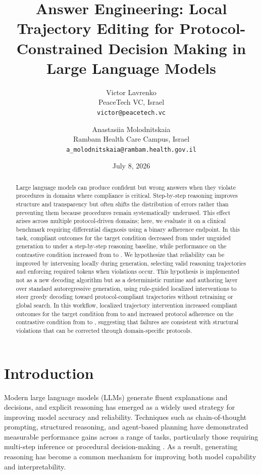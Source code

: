 \documentclass[twocolumn]{article}
\title{Answer Engineering: Local Trajectory Editing for Protocol-Constrained
Decision Making in Large Language Models}
\author{%
  Victor Lavrenko\\
  \small PeaceTech VC, Israel\\
  \small \texttt{victor@peacetech.vc}
  \and
  Anastasiia Molodnitskaia\\
  \small Rambam Health Care Campus, Israel\\
  \small \texttt{a\_molodnitskaia@rambam.health.gov.il}
}
\date{July 8, 2026}
\begin{document}
\maketitle

\begin{abstract}
  Large language models can produce confident but wrong answers when they
  violate procedures in domains where compliance is critical. Step-by-step
  reasoning improves structure and transparency but often shifts the
  distribution of errors rather than preventing them because procedures remain
  systematically underused. This effect arises across multiple protocol-driven
  domains; here, we evaluate it on a clinical benchmark requiring differential
  diagnosis using a binary adherence endpoint. In this task, compliant outcomes
  for the target condition decreased from \SSNHLBaselineAcceptedPct{} under
  unguided generation to \SSNHLReasoningAcceptedPct{} under a step-by-step
  reasoning baseline, while performance on the contrastive condition increased
  from \ConductiveBaselineAcceptedPct{} to \ConductiveReasoningAcceptedPct{}. We
  hypothesize that reliability can be improved by intervening locally during
  generation, selecting valid reasoning trajectories and enforcing required
  tokens when violations occur. This hypothesis is implemented not as a new
  decoding algorithm but as a deterministic runtime and authoring layer over
  standard autoregressive generation, using rule-guided localized interventions
  to steer greedy decoding toward protocol-compliant trajectories without
  retraining or global search. In this workflow, localized trajectory
  intervention increased compliant outcomes for the target condition from
  \SSNHLReasoningAcceptedPct{} to \SSNHLTrajectoryAcceptedPct{} and increased
  protocol adherence on the contrastive condition from
  \ConductiveReasoningAcceptedPct{} to \ConductiveTrajectoryAcceptedPct{},
  suggesting that failures are consistent with structural violations that can be
  corrected through domain-specific protocols.
\end{abstract}

\section{Introduction}\label{sec:introduction}

Modern large language models (LLMs) generate fluent explanations and decisions,
and explicit reasoning has emerged as a widely used strategy for improving model
accuracy and reliability. Techniques such as chain-of-thought prompting,
structured reasoning, and agent-based planning have demonstrated measurable
performance gains across a range of tasks, particularly those requiring
multi-step inference or procedural decision-making
\parencite{wei2022cot,yao2023react,yao2023treeofthoughts,shinn2023reflexion}. As
a result, generating reasoning has become a common mechanism for improving both
model capability and interpretability.
\end{document}
